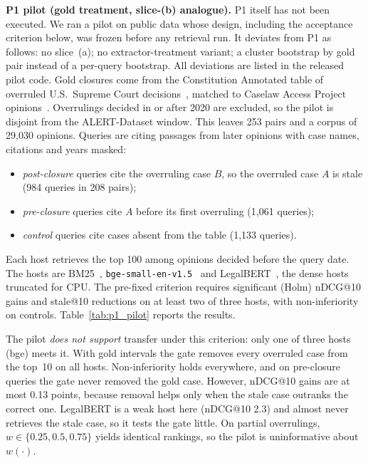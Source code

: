 \textbf{P1 pilot (gold treatment, slice-(b) analogue).} P1 itself has not been executed. We ran a pilot on public data whose design, including the acceptance criterion below, was frozen before any retrieval run. It deviates from P1 as follows: no slice~(a); no extractor-treatment variant; a cluster bootstrap by gold pair instead of a per-query bootstrap. All deviations are listed in the released pilot code. Gold closures come from the Constitution Annotated table of overruled U.S.\ Supreme Court decisions~\citep{conan2022}, matched to Caselaw Access Project opinions~\citep{cap2024}. Overrulings decided in or after 2020 are excluded, so the pilot is disjoint from the ALERT-Dataset window. This leaves 253 pairs and a corpus of 29{,}030 opinions. Queries are citing passages from later opinions with case names, citations and years masked:
\begin{itemize}[leftmargin=1.2em,itemsep=1pt,topsep=2pt]
  \item \emph{post-closure} queries cite the overruling case $B$, so the overruled case $A$ is stale (984 queries in 208 pairs);
  \item \emph{pre-closure} queries cite $A$ before its first overruling (1{,}061 queries);
  \item \emph{control} queries cite cases absent from the table (1{,}133 queries).
\end{itemize}
Each host retrieves the top 100 among opinions decided before the query date. The hosts are BM25~\citep{robertson2009bm25}, \texttt{bge-small-en-v1.5}~\citep{xiao2024cpack} and LegalBERT~\citep{chalkidis2020legalbert}, the dense hosts truncated for CPU. The pre-fixed criterion requires significant (Holm) nDCG@10 gains and stale@10 reductions on at least two of three hosts, with non-inferiority on controls. Table~\ref{tab:p1_pilot} reports the results.

The pilot \emph{does not support} transfer under this criterion: only one of three hosts (bge) meets it. With gold intervals the gate removes every overruled case from the top~10 on all hosts. Non-inferiority holds everywhere, and on pre-closure queries the gate never removed the gold case. However, nDCG@10 gains are at most 0.13 points, because removal helps only when the stale case outranks the correct one. LegalBERT is a weak host here (nDCG@10 2.3) and almost never retrieves the stale case, so it tests the gate little. On partial overrulings, $w\!\in\!\{0.25,0.5,0.75\}$ yields identical rankings, so the pilot is uninformative about $w(\cdot)$.

